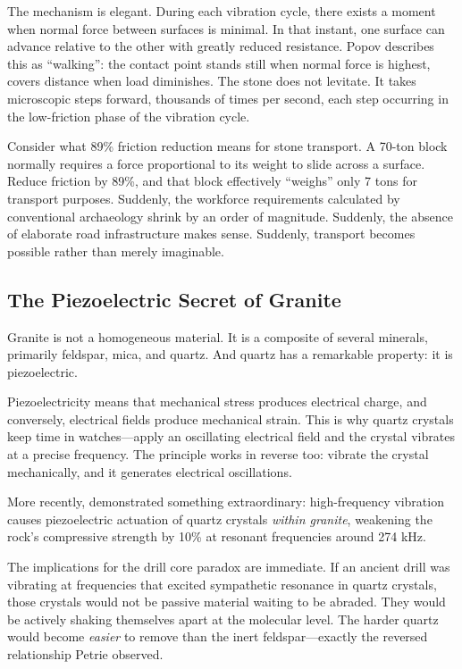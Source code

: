 \documentclass[11pt]{article}
\begin{document}
The mechanism is elegant. During each vibration cycle, there exists a moment when normal force between surfaces is minimal. In that instant, one surface can advance relative to the other with greatly reduced resistance. Popov describes this as ``walking'': the contact point stands still when normal force is highest, covers distance when load diminishes. The stone does not levitate. It takes microscopic steps forward, thousands of times per second, each step occurring in the low-friction phase of the vibration cycle.

Consider what 89\% friction reduction means for stone transport. A 70-ton block normally requires a force proportional to its weight to slide across a surface. Reduce friction by 89\%, and that block effectively ``weighs'' only 7 tons for transport purposes. Suddenly, the workforce requirements calculated by conventional archaeology shrink by an order of magnitude. Suddenly, the absence of elaborate road infrastructure makes sense. Suddenly, transport becomes possible rather than merely imaginable.

\subsection{The Piezoelectric Secret of Granite}

Granite is not a homogeneous material. It is a composite of several minerals, primarily feldspar, mica, and quartz. And quartz has a remarkable property: it is piezoelectric.

Piezoelectricity means that mechanical stress produces electrical charge, and conversely, electrical fields produce mechanical strain. This is why quartz crystals keep time in watches---apply an oscillating electrical field and the crystal vibrates at a precise frequency. The principle works in reverse too: vibrate the crystal mechanically, and it generates electrical oscillations.

More recently, \citet{Saksala2023} demonstrated something extraordinary: high-frequency vibration causes piezoelectric actuation of quartz crystals \textit{within granite}, weakening the rock's compressive strength by 10\% at resonant frequencies around 274 kHz.

The implications for the drill core paradox are immediate. If an ancient drill was vibrating at frequencies that excited sympathetic resonance in quartz crystals, those crystals would not be passive material waiting to be abraded. They would be actively shaking themselves apart at the molecular level. The harder quartz would become \textit{easier} to remove than the inert feldspar---exactly the reversed relationship Petrie observed.
\end{document}
